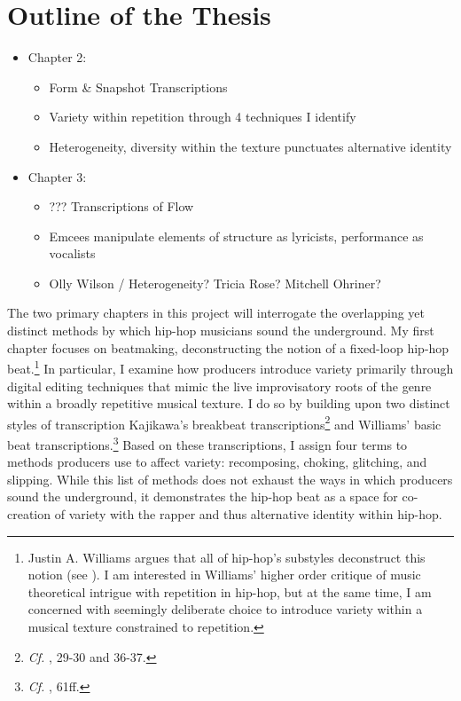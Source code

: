 \section{Outline of the Thesis}
\begin{itemize}
    \item Chapter 2: 
        \begin{itemize}
            \item Form \& Snapshot Transcriptions
            \item Variety within repetition through 4 techniques I identify
            \item Heterogeneity, diversity within the texture punctuates alternative identity
        \end{itemize}
    \item Chapter 3:
        \begin{itemize}
            \item ??? Transcriptions of Flow
            \item Emcees manipulate elements of structure as lyricists, performance as vocalists
            \item Olly Wilson / Heterogeneity? Tricia Rose? Mitchell Ohriner?
        \end{itemize}
\end{itemize}

The two primary chapters in this project will interrogate the overlapping yet distinct methods
by which hip-hop musicians sound the underground. My first chapter focuses on beatmaking, deconstructing 
the notion of a fixed-loop hip-hop beat.\footnote{Justin A. Williams argues that all of hip-hop's 
substyles deconstruct this notion (see \cite{justinawilliamsBeatsFlowsResponse2009}). I am interested 
in Williams' higher order critique of music theoretical intrigue with repetition in hip-hop, but at 
the same time, I am concerned with seemingly deliberate choice to introduce variety within a musical 
texture constrained to repetition.} In particular, I examine how producers introduce variety primarily
through digital editing techniques that mimic the live improvisatory roots of the genre within a broadly
repetitive musical texture. I do so by building upon two distinct styles of transcription\textemdash
Kajikawa's breakbeat  transcriptions\footnote{\textit{Cf.} \cite{lorenkajikawaSoundingRaceRap2015}, 29-30 
and 36-37.} and Williams' basic beat transcriptions.\footnote{\textit{Cf.}
\cite{justinawilliamsRhyminStealinMusical2013}, 61ff.} Based on these transcriptions, I assign four 
terms to methods producers use to affect variety: recomposing, choking, glitching, and slipping. While 
this list of methods does not exhaust the ways in which producers sound the underground, it demonstrates 
the hip-hop beat as a space for co-creation of variety with the rapper and thus alternative identity 
within hip-hop.

